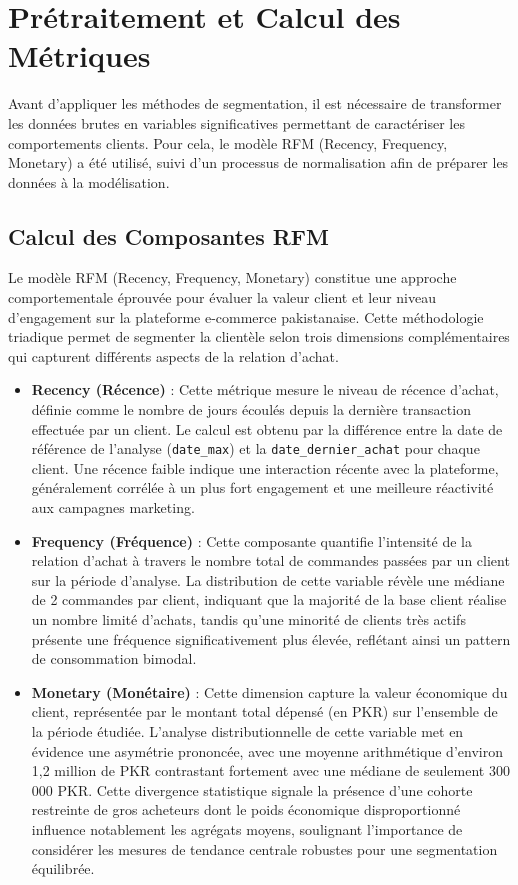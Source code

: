 \documentclass[a4paper,12pt]{article}
\begin{document}
\section{Prétraitement et Calcul des Métriques}

Avant d’appliquer les méthodes de segmentation, il est nécessaire de transformer les données brutes en variables 
significatives permettant de caractériser les comportements clients. Pour cela, le modèle RFM (Recency, Frequency, Monetary) 
a été utilisé, suivi d’un processus de normalisation afin de préparer les données à la modélisation.
\subsection{Calcul des Composantes RFM}
Le modèle RFM (Recency, Frequency, Monetary) constitue une approche comportementale éprouvée pour évaluer la valeur client et leur niveau d'engagement sur la plateforme e-commerce pakistanaise. Cette méthodologie triadique permet de segmenter la clientèle selon trois dimensions complémentaires qui capturent différents aspects de la relation d'achat.

\begin{itemize}
    \item \textbf{Recency (Récence)} : Cette métrique mesure le niveau de récence d'achat, définie comme le nombre de jours écoulés depuis la dernière transaction effectuée par un client. Le calcul est obtenu par la différence entre la date de référence de l'analyse (\texttt{date\_max}) et la \texttt{date\_dernier\_achat} pour chaque client. Une récence faible indique une interaction récente avec la plateforme, généralement corrélée à un plus fort engagement et une meilleure réactivité aux campagnes marketing.
    
    \item \textbf{Frequency (Fréquence)} : Cette composante quantifie l'intensité de la relation d'achat à travers le nombre total de commandes passées par un client sur la période d'analyse. La distribution de cette variable révèle une médiane de 2 commandes par client, indiquant que la majorité de la base client réalise un nombre limité d'achats, tandis qu'une minorité de clients très actifs présente une fréquence significativement plus élevée, reflétant ainsi un pattern de consommation bimodal.
    
    \item \textbf{Monetary (Monétaire)} : Cette dimension capture la valeur économique du client, représentée par le montant total dépensé (en PKR) sur l'ensemble de la période étudiée. L'analyse distributionnelle de cette variable met en évidence une asymétrie prononcée, avec une moyenne arithmétique d'environ 1,2 million de PKR contrastant fortement avec une médiane de seulement 300 000 PKR. Cette divergence statistique signale la présence d'une cohorte restreinte de gros acheteurs dont le poids économique disproportionné influence notablement les agrégats moyens, soulignant l'importance de considérer les mesures de tendance centrale robustes pour une segmentation équilibrée.
\end{itemize}
\end{document}
